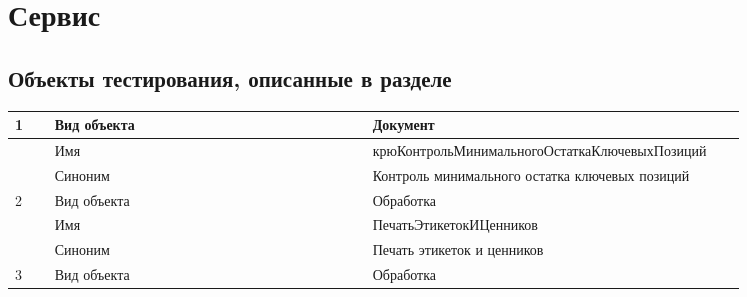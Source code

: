 \section{Сервис}

\subsection{Объекты тестирования, описанные в разделе}

\begin{tabular}{p{0.05\linewidth}p{0.4\linewidth}p{0.4\linewidth}}
    \toprule
    1 & Вид объекта & Документ \\
    \hline
    & Имя & крюКонтрольМинимальногоОстаткаКлючевыхПозиций \\
    \hline
    & Синоним  & Контроль минимального остатка ключевых позиций \\
    \hline
    2 & Вид объекта  & Обработка \\
    \hline
    & Имя & ПечатьЭтикетокИЦенников \\
    \hline
    & Синоним  & Печать этикеток и ценников \\
    \hline
    3 & Вид объекта  & Обработка \\
    \hline

    \bottomrule %
\end{tabular}



